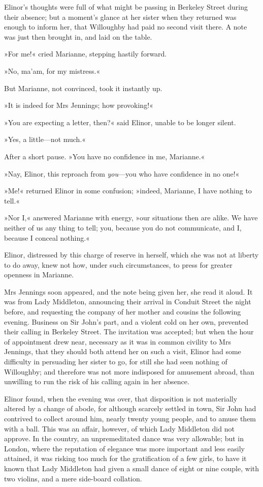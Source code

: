 Elinor’s thoughts were full of what might be passing in Berkeley Street during their absence; but a moment’s glance at her sister when they returned was enough to inform her, that Willoughby had paid no second visit there. A note was just then brought in, and laid on the table.

»For me!« cried Marianne, stepping hastily forward.

»No, ma’am, for my mistress.«

But Marianne, not convinced, took it instantly up.

»It is indeed for Mrs Jennings; how provoking!«

»You are expecting a letter, then?« said Elinor, unable to be longer silent.

»Yes, a little—not much.«

After a short pause. »You have no confidence in me, Marianne.«

»Nay, Elinor, this reproach from \textit{you}—you who have confidence in no one!«

»Me!« returned Elinor in some confusion; »indeed, Marianne, I have nothing to tell.«

»Nor I,« answered Marianne with energy, »our situations then are alike. We have neither of us any thing to tell; you, because you do not communicate, and I, because I conceal nothing.«

Elinor, distressed by this charge of reserve in herself, which she was not at liberty to do away, knew not how, under such circumstances, to press for greater openness in Marianne.

Mrs Jennings soon appeared, and the note being given her, she read it aloud. It was from Lady Middleton, announcing their arrival in Conduit Street the night before, and requesting the company of her mother and cousins the following evening. Business on Sir John’s part, and a violent cold on her own, prevented their calling in Berkeley Street. The invitation was accepted; but when the hour of appointment drew near, necessary as it was in common civility to Mrs Jennings, that they should both attend her on such a visit, Elinor had some difficulty in persuading her sister to go, for still she had seen nothing of Willoughby; and therefore was not more indisposed for amusement abroad, than unwilling to run the risk of his calling again in her absence.

Elinor found, when the evening was over, that disposition is not materially altered by a change of abode, for although scarcely settled in town, Sir John had contrived to collect around him, nearly twenty young people, and to amuse them with a ball. This was an affair, however, of which Lady Middleton did not approve. In the country, an unpremeditated dance was very allowable; but in London, where the reputation of elegance was more important and less easily attained, it was risking too much for the gratification of a few girls, to have it known that Lady Middleton had given a small dance of eight or nine couple, with two violins, and a mere side-board collation.


